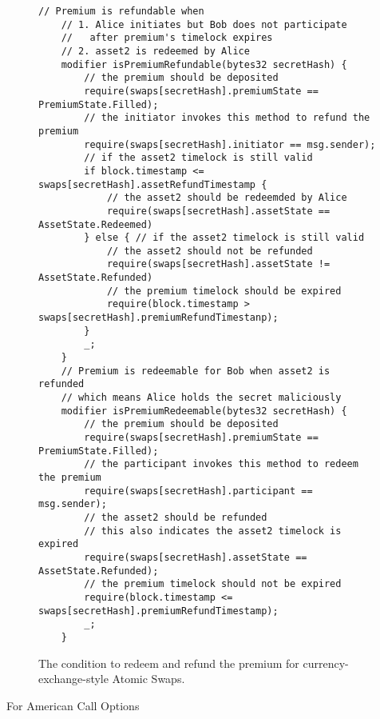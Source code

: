\begin{figure}
    \begin{lstlisting}[language=Solidity, basicstyle=\tiny]
    // Premium is refundable when
    // 1. Alice initiates but Bob does not participate
    //   after premium's timelock expires
    // 2. asset2 is redeemed by Alice
    modifier isPremiumRefundable(bytes32 secretHash) {
        // the premium should be deposited
        require(swaps[secretHash].premiumState == PremiumState.Filled);
        // the initiator invokes this method to refund the premium
        require(swaps[secretHash].initiator == msg.sender);
        // if the asset2 timelock is still valid
        if block.timestamp <= swaps[secretHash].assetRefundTimestamp {
            // the asset2 should be redeemded by Alice
            require(swaps[secretHash].assetState == AssetState.Redeemed)
        } else { // if the asset2 timelock is still valid
            // the asset2 should not be refunded
            require(swaps[secretHash].assetState != AssetState.Refunded)
            // the premium timelock should be expired
            require(block.timestamp > swaps[secretHash].premiumRefundTimestanp);
        }
        _;
    }
    // Premium is redeemable for Bob when asset2 is refunded
    // which means Alice holds the secret maliciously
    modifier isPremiumRedeemable(bytes32 secretHash) {
        // the premium should be deposited
        require(swaps[secretHash].premiumState == PremiumState.Filled);
        // the participant invokes this method to redeem the premium
        require(swaps[secretHash].participant == msg.sender);
        // the asset2 should be refunded
        // this also indicates the asset2 timelock is expired
        require(swaps[secretHash].assetState == AssetState.Refunded);
        // the premium timelock should not be expired
        require(block.timestamp <= swaps[secretHash].premiumRefundTimestamp);
        _;
    }
    \end{lstlisting}
    \label{code:premium_condition}
    \caption{The condition to redeem and refund the premium for currency-exchange-style Atomic Swaps.}
\end{figure}


For American Call Options

